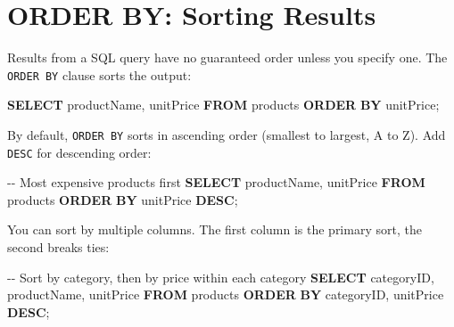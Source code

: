 \documentclass[
  letterpaper,
  DIV=11,
  numbers=noendperiod]{scrreprt}
\newenvironment{Shaded}{\begin{snugshade}}{\end{snugshade}}
\newcommand{\CommentTok}[1]{\textcolor[rgb]{0.37,0.37,0.37}{#1}}
\newcommand{\KeywordTok}[1]{\textcolor[rgb]{0.00,0.23,0.31}{\textbf{#1}}}
\newcommand{\NormalTok}[1]{\textcolor[rgb]{0.00,0.23,0.31}{#1}}
\begin{document}
\section{ORDER BY: Sorting Results}\label{order-by-sorting-results}

Results from a SQL query have no guaranteed order unless you specify
one. The \texttt{ORDER\ BY} clause sorts the output:

\begin{codelisting}

\caption{\texttt{duckdb}}

\begin{Shaded}
\begin{Highlighting}[]
\KeywordTok{SELECT}
\NormalTok{    productName,}
\NormalTok{    unitPrice}
\KeywordTok{FROM}\NormalTok{ products}
\KeywordTok{ORDER} \KeywordTok{BY}\NormalTok{ unitPrice;}
\end{Highlighting}
\end{Shaded}

\end{codelisting}

By default, \texttt{ORDER\ BY} sorts in ascending order (smallest to
largest, A to Z). Add \texttt{DESC} for descending order:

\begin{codelisting}

\caption{\texttt{duckdb}}

\begin{Shaded}
\begin{Highlighting}[]
\CommentTok{{-}{-} Most expensive products first}
\KeywordTok{SELECT}
\NormalTok{    productName,}
\NormalTok{    unitPrice}
\KeywordTok{FROM}\NormalTok{ products}
\KeywordTok{ORDER} \KeywordTok{BY}\NormalTok{ unitPrice }\KeywordTok{DESC}\NormalTok{;}
\end{Highlighting}
\end{Shaded}

\end{codelisting}

You can sort by multiple columns. The first column is the primary sort,
the second breaks ties:

\begin{codelisting}

\caption{\texttt{duckdb}}

\begin{Shaded}
\begin{Highlighting}[]
\CommentTok{{-}{-} Sort by category, then by price within each category}
\KeywordTok{SELECT}
\NormalTok{    categoryID,}
\NormalTok{    productName,}
\NormalTok{    unitPrice}
\KeywordTok{FROM}\NormalTok{ products}
\KeywordTok{ORDER} \KeywordTok{BY}\NormalTok{ categoryID, unitPrice }\KeywordTok{DESC}\NormalTok{;}
\end{Highlighting}
\end{Shaded}

\end{codelisting}
\end{document}
